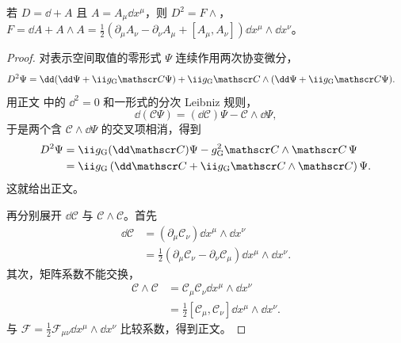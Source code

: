 \begin{proposition}[曲率二形式的分量]
若 $D=\dd+A$ 且 $A=A_\mu\dd x^\mu$，则 $D^2=F\wedge$，$F=\dd A+A\wedge A=\frac12(\partial_\mu A_\nu-\partial_\nu A_\mu+[A_\mu,A_\nu])\dd x^\mu\wedge\dd x^\nu$。
\end{proposition}
\begin{proof}
对表示空间取值的零形式 $\Psi$ 连续作用两次协变微分，
\begin{align*}
 D^2\Psi
 &=\dd(\dd\Psi+\ii g_{\rm G}\mathscr C\Psi)
 +\ii g_{\rm G}\mathscr C\wedge(\dd\Psi+\ii g_{\rm G}\mathscr C\Psi).
\end{align*}
用正文 中的 $\dd^2=0$ 和一形式的分次 Leibniz 规则，
\begin{equation*}
 \dd(\mathscr C\Psi)=(\dd\mathscr C)\Psi-\mathscr C\wedge\dd\Psi,
\end{equation*}
于是两个含 $\mathscr C\wedge\dd\Psi$ 的交叉项相消，得到
\begin{align*}
 D^2\Psi
 &=\ii g_{\rm G}(\dd\mathscr C)\Psi
 -g_{\rm G}^2\mathscr C\wedge\mathscr C\,\Psi\\
 &=\ii g_{\rm G}
 \left(\dd\mathscr C+\ii g_{\rm G}\mathscr C\wedge\mathscr C\right)\Psi.
\end{align*}
这就给出正文。

再分别展开 $\dd\mathscr C$ 与 $\mathscr C\wedge\mathscr C$。首先
\begin{align*}
 \dd\mathscr C
 &=(\partial_\mu\mathscr C_\nu)\dd x^\mu\wedge\dd x^\nu\\
 &=\frac12(\partial_\mu\mathscr C_\nu-\partial_\nu\mathscr C_\mu)
 \dd x^\mu\wedge\dd x^\nu.
\end{align*}
其次，矩阵系数不能交换，
\begin{align*}
 \mathscr C\wedge\mathscr C
 &=\mathscr C_\mu\mathscr C_\nu\dd x^\mu\wedge\dd x^\nu\\
 &=\frac12[\mathscr C_\mu,\mathscr C_\nu]\dd x^\mu\wedge\dd x^\nu.
\end{align*}
与 $\mathcal F=\tfrac12\mathcal F_{\mu\nu}\dd x^\mu\wedge\dd x^\nu$ 比较系数，得到正文。
\end{proof}

